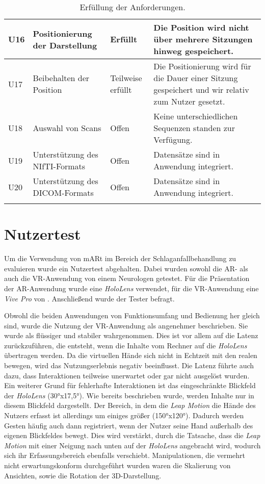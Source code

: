 \begin{longtable} {p{}p{}p{}p{}}
\midrule 
U16 & Positionierung der Darstellung & Erfüllt & Die Position wird nicht über mehrere Sitzungen hinweg gespeichert.\\
\midrule 
U17 & Beibehalten der Position & Teilweise erfüllt & Die Positionierung wird für die Dauer einer Sitzung gespeichert und wir relativ zum Nutzer gesetzt.\\
\midrule 
U18 & Auswahl von Scans & Offen & Keine unterschiedlichen Sequenzen standen zur Verfügung.\\
\midrule 
U19 & Unterstützung des NIfTI-Formats & Offen & Datensätze sind in Anwendung integriert.\\
\midrule 
U20 & Unterstützung des DICOM-Formats & Offen & Datensätze sind in Anwendung integriert.\\

\bottomrule
\caption{\label{tab:evaluation}Erfüllung der Anforderungen.}
\end{longtable}

\section{Nutzertest}
\label{nazuertest}

Um die Verwendung von mARt im Bereich der Schlaganfallbehandlung zu evaluieren wurde ein Nutzertest abgehalten. 
Dabei wurden sowohl die AR- als auch die VR-Anwendung von einem Neurologen getestet. Für die Präsentation der AR-Anwendung wurde eine \textit{HoloLens} verwendet, für die VR-Anwendung eine \textit{Vive Pro} von \cite{vivePro}. Anschließend wurde der Tester befragt.

Obwohl die beiden Anwendungen von Funktionsumfang und Bedienung her gleich sind, wurde die Nutzung der VR-Anwendung als angenehmer beschrieben. 
Sie wurde als flüssiger und stabiler wahrgenommen. 
Dies ist vor allem auf die Latenz zurückzuführen, die entsteht, wenn die Inhalte vom Rechner auf die \textit{HoloLens} übertragen werden. Da die virtuellen Hände sich nicht in Echtzeit mit den realen bewegen, wird das Nutzungserlebnis negativ beeinflusst. 
Die Latenz führte auch dazu, dass Interaktionen teilweise unerwartet oder gar nicht ausgelöst wurden. 
Ein weiterer Grund für fehlerhafte Interaktionen ist das eingeschränkte Blickfeld der \textit{HoloLens} (30°x17,5°). Wie bereits beschrieben wurde, werden Inhalte nur in diesem Blickfeld dargestellt. Der Bereich, in dem die \textit{Leap Motion} die Hände des Nutzers erfasst ist allerdings um einiges größer (150°x120°). Dadurch werden Gesten häufig auch dann registriert, wenn der Nutzer seine Hand außerhalb des eigenen Blickfeldes bewegt. Dies wird verstärkt, durch die Tatsache, dass die \textit{Leap Motion} mit einer Neigung nach unten auf der \textit{HoloLens} angebracht wird, wodurch sich ihr Erfassungsbereich ebenfalls verschiebt.
Manipulationen, die vermehrt nicht erwartungskonform durchgeführt wurden waren die Skalierung von Ansichten, sowie die Rotation der 3D-Darstellung.

